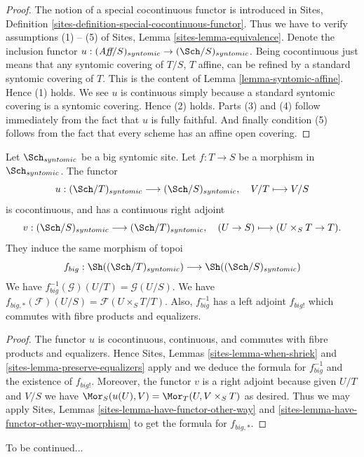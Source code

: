 \begin{proof}
The notion of a special cocontinuous functor is introduced in
Sites, Definition \ref{sites-definition-special-cocontinuous-functor}.
Thus we have to verify assumptions (1) -- (5) of
Sites, Lemma \ref{sites-lemma-equivalence}.
Denote the inclusion functor
$u : (\textit{Aff}/S)_{syntomic} \to (\Sch/S)_{syntomic}$.
Being cocontinuous just means that any syntomic covering of
$T/S$, $T$ affine, can be refined by a standard syntomic covering of $T$.
This is the content of
Lemma \ref{lemma-syntomic-affine}.
Hence (1) holds. We see $u$ is continuous simply because a standard
syntomic covering is a syntomic covering. Hence (2) holds.
Parts (3) and (4) follow immediately from the fact that $u$ is
fully faithful. And finally condition (5) follows from the
fact that every scheme has an affine open covering.
\end{proof}

\begin{lemma}
\label{lemma-morphism-big-syntomic}
Let $\Sch_{syntomic}$ be a big syntomic site.
Let $f : T \to S$ be a morphism in $\Sch_{syntomic}$.
The functor
$$
u : (\Sch/T)_{syntomic} \longrightarrow (\Sch/S)_{syntomic},
\quad
V/T \longmapsto V/S
$$
is cocontinuous, and has a continuous right adjoint
$$
v : (\Sch/S)_{syntomic} \longrightarrow (\Sch/T)_{syntomic},
\quad
(U \to S) \longmapsto (U \times_S T \to T).
$$
They induce the same morphism of topoi
$$
f_{big} :
\Sh((\Sch/T)_{syntomic})
\longrightarrow
\Sh((\Sch/S)_{syntomic})
$$
We have $f_{big}^{-1}(\mathcal{G})(U/T) = \mathcal{G}(U/S)$.
We have $f_{big, *}(\mathcal{F})(U/S) = \mathcal{F}(U \times_S T/T)$.
Also, $f_{big}^{-1}$ has a left adjoint $f_{big!}$ which commutes with
fibre products and equalizers.
\end{lemma}

\begin{proof}
The functor $u$ is cocontinuous, continuous, and commutes with fibre products
and equalizers. Hence
Sites, Lemmas \ref{sites-lemma-when-shriek} and
\ref{sites-lemma-preserve-equalizers}
apply and we deduce the formula
for $f_{big}^{-1}$ and the existence of $f_{big!}$. Moreover,
the functor $v$ is a right adjoint because given $U/T$ and $V/S$
we have $\Mor_S(u(U), V) = \Mor_T(U, V \times_S T)$
as desired. Thus we may apply
Sites, Lemmas \ref{sites-lemma-have-functor-other-way} and
\ref{sites-lemma-have-functor-other-way-morphism} to get the
formula for $f_{big, *}$.
\end{proof}

\noindent
To be continued...













